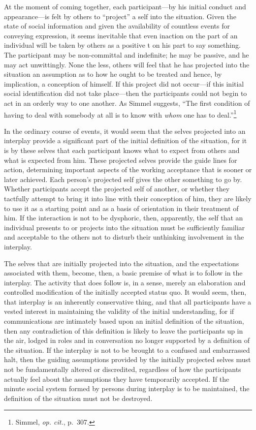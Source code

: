 \documentclass[twoside,symmetric,nobib,justified]{tufte-book}
\begin{document}
At the moment of coming together, each participant---by his initial
conduct and appearance---is felt by others to ``project'' a self into
the situation. Given the state of social information and given the
availability of countless events for conveying expression, it seems
inevitable that even inaction on the part of an individual will be taken
by others as a positive t on his part to say something. The participant
may be non-committal and indefinite; he may be passive, and he may act
unwittingly. None the less, others will feel that he has projected into
the situation an assumption as to how he ought to be treated and hence,
by implication, a conception of himself. If this project did not
occur---if this initial social identification did not take place---then
the participants could not begin to act in an orderly way to one
another. As Simmel suggests, ``The first condition of having to deal
with somebody at all is to know with \emph{whom} one has to
deal.''\footnote{Simmel, \emph{op. cit.}, p.~307.}

In the ordinary course of events, it would seem that the selves
projected into an interplay provide a significant part of the initial
definition of the situation, for it is by these selves that each
participant knows what to expect from others and what is expected from
him. These projected selves provide the guide lines for action,
determining important aspects of the working acceptance that is sooner
or later achieved. Each person's projected self gives the other
something to go by. Whether participants accept the projected self of
another, or whether they tactfully attempt to bring it into line with
their conception of him, they are likely to use it as a starting point
and as a basis of orientation in their treatment of him. If the
interaction is not to be dysphoric, then, apparently, the self that an
individual presents to or projects into the situation must be
sufficiently familiar and acceptable to the others not to disturb their
unthinking involvement in the interplay.

The selves that are initially projected into the situation, and the
expectations associated with them, become, then, a basic premise of what
is to follow in the interplay. The activity that does follow is, in a
sense, merely an elaboration and controlled modification of the
initially accepted status quo. It would seem, then, that interplay is an
inherently conservative thing, and that all participants have a vested
interest in maintaining the validity of the initial understanding, for
if communications are intimately based upon an initial definition of the
situation, then any contradiction of this definition is likely to leave
the participants up in the air, lodged in roles and in conversation no
longer supported by a definition of the situation. If the interplay is
not to be brought to a confused and embarrassed halt, then the guiding
assumptions provided by the initially projected selves must not be
fundamentally altered or discredited, regardless of how the participants
actually feel about the assumptions they have temporarily accepted. If
the minute social system formed by persons during interplay is to be
maintained, the definition of the situation must not be destroyed.
\end{document}
